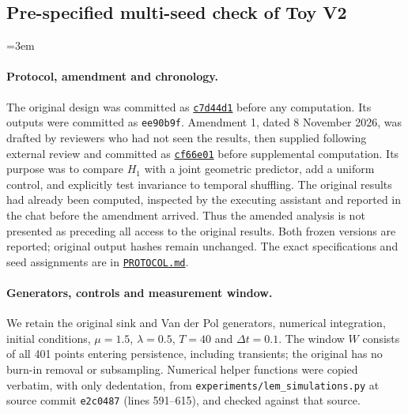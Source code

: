 \subsection{Pre-specified multi-seed check of Toy V2}
\label{sec:toy2robustness}
\begingroup
\emergencystretch=3em

\paragraph{Protocol, amendment and chronology.}
The original design was committed as
\href{https://github.com/LAKITALKS/LEM/commit/c7d44d1dcbfc1bef889601dda69dcc95b8500cb3}{\texttt{c7d44d1}}
before any computation. Its outputs were committed as \texttt{ee90b9f}.
Amendment 1, dated 8 November 2026, was drafted by reviewers who had not seen
the results, then supplied following external review and committed as
\href{https://github.com/LAKITALKS/LEM/commit/cf66e01fb868d829948cea0bc8c7b550181f208c}{\texttt{cf66e01}}
before supplemental computation. Its purpose was to compare $H_1$ with a joint
geometric predictor, add a uniform control, and explicitly test invariance to
temporal shuffling. The original results had already been computed, inspected by
the executing assistant and reported in the chat before the amendment arrived.
Thus the amended analysis is not presented as preceding all access to the original
results. Both frozen versions are reported; original output hashes remain unchanged.
The exact specifications and seed assignments are in
\href{https://github.com/LAKITALKS/LEM/blob/v2.3-toy-v2-robustness/experiments/toy_v2_robustness/PROTOCOL.md}{\texttt{PROTOCOL.md}}.

\paragraph{Generators, controls and measurement window.}
We retain the original sink and Van der Pol generators, numerical integration,
initial conditions, $\mu=1.5$, $\lambda=0.5$, $T=40$ and $\Delta t=0.1$.
The window $W$ consists of all 401 points entering persistence, including
transients; the original has no burn-in removal or subsampling. Numerical helper
functions were copied verbatim, with only dedentation, from
\texttt{experiments/lem\_simulations.py} at source commit \texttt{e2c0487}
(lines 591--615), and checked against that source.


